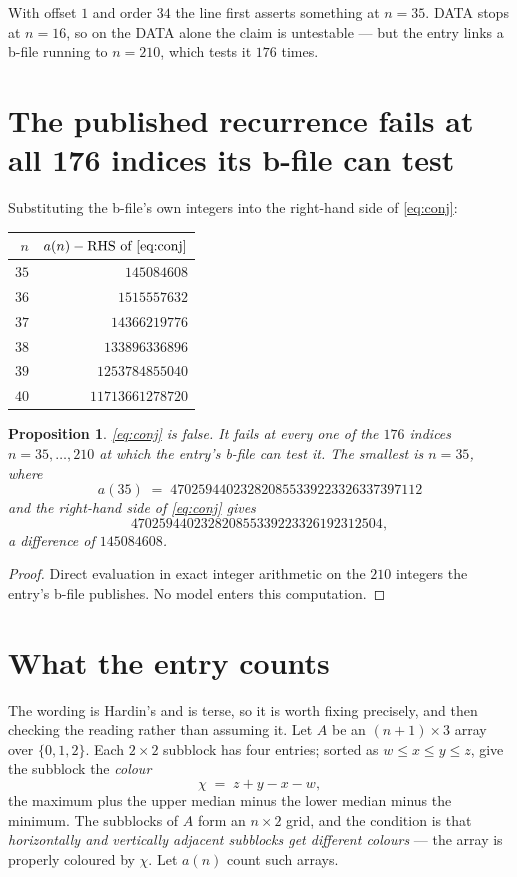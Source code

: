 \documentclass[11pt,a4paper]{article}
\theoremstyle{plain}
\newtheorem{proposition}[theorem]{Proposition}
\theoremstyle{definition}
\begin{document}
With offset $1$ and order $34$ the line first asserts something at $n=35$. DATA stops at
$n=16$, so on the DATA alone the claim is untestable --- but the entry links a b-file running
to $n=210$, which tests it $176$ times.

\section{The published recurrence fails at all 176 indices its b-file can test}

Substituting the b-file's own integers into the right-hand side of \eqref{eq:conj}:

\begin{center}\small
\begin{tabular}{rr}
\toprule
$n$ & $a(n)-\text{RHS of \eqref{eq:conj}}$ \\
\midrule
$35$ & $145084608$\\
$36$ & $1515557632$\\
$37$ & $14366219776$\\
$38$ & $133896336896$\\
$39$ & $1253784855040$\\
$40$ & $11713661278720$\\
\bottomrule
\end{tabular}
\end{center}

\begin{proposition}
\eqref{eq:conj} is false. It fails at every one of the $176$ indices
$n=35,\dots,210$ at which the entry's b-file can test it. The smallest is $n=35$, where
\[
a(35)\;=\;470259440232820855339223326337397112
\]
and the right-hand side of \eqref{eq:conj} gives
\[
470259440232820855339223326192312504,
\]
a difference of $145084608$.
\end{proposition}

\begin{proof}
Direct evaluation in exact integer arithmetic on the $210$ integers the entry's b-file
publishes. No model enters this computation.
\end{proof}

\section{What the entry counts}

The wording is Hardin's and is terse, so it is worth fixing precisely, and then checking the
reading rather than assuming it. Let $A$ be an $(n+1)\times3$ array over $\{0,1,2\}$. Each
$2\times2$ subblock has four entries; sorted as $w\le x\le y\le z$, give the subblock the
\emph{colour}
\[
\chi \;=\; z + y - x - w ,
\]
the maximum plus the upper median minus the lower median minus the minimum. The subblocks of
$A$ form an $n\times2$ grid, and the condition is that \emph{horizontally and vertically
adjacent subblocks get different colours} --- the array is properly coloured by $\chi$.
Let $a(n)$ count such arrays.
\end{document}
